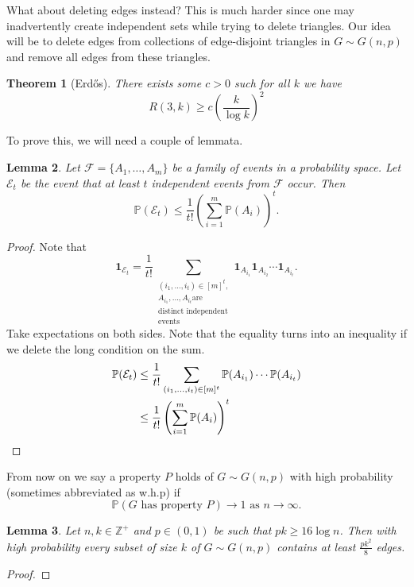 \documentclass{report}
\theoremstyle{definition}
\theoremstyle{plain}
\newtheorem{thm}{Theorem}
\newtheorem{lem}[thm]{Lemma}
\theoremstyle{definition}
\begin{document}
	What about deleting edges instead? This is much harder since one may inadvertently create independent sets while trying to delete triangles. Our idea will be to delete edges from collections of edge-disjoint triangles in $G\sim G(n,p)$ and remove all edges from these triangles.
	
	\begin{thm}[Erd\H{o}s]
		There exists some $c>0$ such for all $k$ we have
		\[
			R(3,k) \geq c \left(\frac{k}{\log k}\right)^2
		\]
	\end{thm}
	To prove this, we will need a couple of lemmata. 
	\begin{lem}
		Let $\mathcal{F}=\{A_1,\ldots, A_m\}$ be a family of events in a probability space. Let $\mathcal{E}_t$ be the event that at least $t$ independent events from $\mathcal{F}$ occur. Then
		\[
			\mathbb{P}(\mathcal{E}_t) \leq \frac{1}{t!} \left(\sum_{i=1}^{m}\mathbb{P}(A_i)\right)^t.
		\]
	\end{lem}
	\begin{proof}
		Note that 
		\[\mathbf{1}_{\mathcal{E}_t} = \frac{1}{t!}\sum_{\substack{(i_1,\ldots,i_t)\in [m]^{t},\\ A_{i_1},\ldots, A_{i_t} \text{are}\\ \text{distinct independent}\\ \text{events}}}\mathbf{1}_{A_{i_1}}\mathbf{1}_{A_{i_2}}\cdots \mathbf{1}_{A_{i_t}}.\]
		Take expectations on both sides. Note that the equality turns into an inequality if we delete the long condition on the sum.
		\begin{align*}
			\mathbb{P}(\mathcal{E}_t) &\leq \frac{1}{t!} \sum_{(i_1,\ldots,i_t)\in [m]^{t}} \mathbb{P}(A_{i_1}) \cdots \mathbb{P}(A_{i_t})\\
			& \leq \frac{1}{t!}\left(\sum_{i = 1}^{m}\mathbb{P}(A_i)\right)^t\qedhere
		\end{align*}
	\end{proof}
	From now on we say a property $P$ holds of $G\sim G(n,p)$ with high probability (sometimes abbreviated as w.h.p) if 
	\[
		\mathbb{P}(G\text{ has property }P) \to 1 \text{ as }n\to \infty.
	\]
	\begin{lem}
		Let $n,k\in\mathbb{Z}^{+}$ and $p\in (0,1)$ be such that $pk \geq 16 \log n$. Then with high probability every subset of size $k$ of $G\sim G(n,p)$ contains at least $\frac{pk^2}{8}$ edges.
	\end{lem}
	\begin{proof}
		
	\end{proof}
\end{document}

